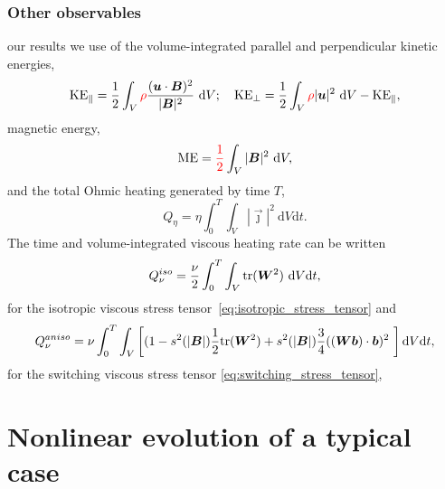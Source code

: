 \subsubsection{Other observables}

 our results we use of the volume-integrated parallel and perpendicular kinetic energies,
\begin{equation}
  \label{eq:kinetic_energies}
  \text{KE}_{\parallel} = \frac{1}{2} \int_V \textcolor{red}{\rho}\frac{({\bm u}\cdot{\bm B})^2}{|{\bm B}|^2}\ \text{d}V; \quad
  \text{KE}_{\perp} = \frac{1}{2} \int_V \textcolor{red}{\rho}|{\bm u}|^2\ \text{d}V - \text{KE}_{\parallel},
\end{equation}
 magnetic energy,
\begin{equation}
  \label{eq:magnetic_energy}
   \text{ME} = \textcolor{red}{\frac12}\int_V |{\bm B}|^2\ \text{d}V,
\end{equation}
and the total Ohmic heating generated by time $T$,
\begin{equation}
  \label{eq:ohmic_heating}
  Q_{\eta} = \eta \int_0^{T} \int_V |\vec{\jmath}|^2\ \text{d}V \text{d}t.
\end{equation}
The time and volume-integrated viscous heating rate can be written
\begin{equation}
  \label{eq:iso_viscous_heating}
  Q_{\nu}^{iso} = \frac{\nu}{2} \int_0^T \int_V
  \text{tr}({\bm W}^2)\  \text{d}V \text{d}t,
\end{equation}
for the isotropic viscous stress
tensor~\eqref{eq:isotropic_stress_tensor} and 
\begin{equation}
  \label{eq:aniso_viscous_heating}
  Q_{\nu}^{aniso} = \nu \int_0^T \int_V \left[ (1-s^2(|{\bm B}|)\frac{1}{2}\text{tr}({\bm W}^2) + s^2(|{\bm B}|)\frac{3 }{4} (({\bm W} {\bm b}) \cdot {\bm b})^2\ \right] \text{d}V \text{d}t,
\end{equation}
for the switching viscous stress tensor \eqref{eq:switching_stress_tensor}, 

\section{Nonlinear evolution of a typical case}
\label{sec:results}

